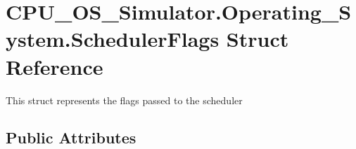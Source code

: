 \hypertarget{struct_c_p_u___o_s___simulator_1_1_operating___system_1_1_scheduler_flags}{}\section{C\+P\+U\+\_\+\+O\+S\+\_\+\+Simulator.\+Operating\+\_\+\+System.\+Scheduler\+Flags Struct Reference}
\label{struct_c_p_u___o_s___simulator_1_1_operating___system_1_1_scheduler_flags}


This struct represents the flags passed to the scheduler  


\subsection*{Public Attributes}
